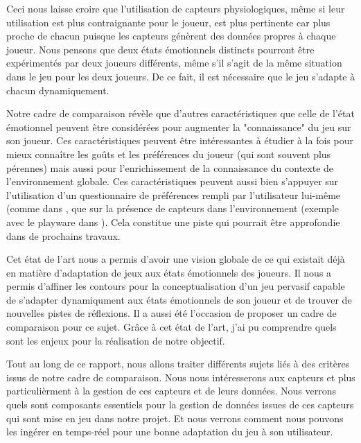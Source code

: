 \documentclass[11pt]{article}
\begin{document}
		Ceci nous laisse croire que l'utilisation de capteurs physiologiques, même si leur utilisation est plus contraignante pour le joueur, est plus pertinente car plus proche de chacun puisque les capteurs génèrent des données propres à chaque joueur.
		Nous pensons que deux états émotionnels distincts pourront être expérimentés par deux joueurs différents, même s'il s'agit de la même situation dans le jeu pour les deux joueurs.
		De ce fait, il est nécessaire que le jeu s'adapte à chacun dynamiquement.\par
		Notre cadre de comparaison révèle que d'autres caractéristiques que celle de l'état émotionnel peuvent être considérées pour augmenter la "connaissance" du jeu sur son joueur.
		Ces caractéristiques peuvent être intéressantes à étudier à la fois pour mieux connaître les goûts et les préférences du joueur (qui sont souvent plus pérennes) mais aussi pour l'enrichissement de la connaissance du contexte de l'environnement globale.
		Ces caractéristiques peuvent aussi bien s'appuyer sur l'utilisation d'un questionnaire de préférences rempli par l'utilisateur lui-même (comme dans \cite{carofiglio_et_al._2019, maier_et_al._2019}, que sur la présence de capteurs dans l'environnement (exemple avec le playware dans \cite{yannakakis_et_al._2013}).
		Cela constitue une piste qui pourrait être approfondie dans de prochains travaux.\par
		Cet état de l'art nous a permis d'avoir une vision globale de ce qui existait déjà en matière d'adaptation de jeux aux états émotionnels des joueurs. 
		Il nous a permis d'affiner les contours pour la conceptualisation d'un jeu pervasif capable de s'adapter dynamiqument aux états émotionnels de son joueur et de trouver de nouvelles pistes de réflexions. 
		Il a aussi été l'occasion de proposer un cadre de comparaison pour ce sujet.
		Grâce à cet état de l'art, j'ai pu comprendre quels sont les enjeux pour la réalisation de notre objectif.\par
		Tout au long de ce rapport, nous allons traiter différents sujets liés à des critères issus de notre cadre de comparaison.
		Nous nous intéresserons aux capteurs et plus particulièrment à la gestion de ces capteurs et de leurs données.
		Nous verrons quels sont composants essentiels pour la gestion de données issues de ces capteurs qui sont mise en jeu dans notre projet.
		Et nous verrons comment nous pouvons les ingérer en temps-réel pour une bonne adaptation du jeu à son utilisateur.
\end{document}
